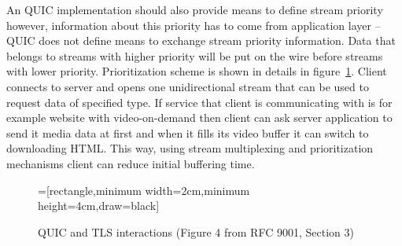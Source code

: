 An QUIC implementation should also provide means to define stream priority however, information about this priority has to come
from application layer -- QUIC does not define means to exchange stream priority information.
Data that belongs to streams with higher priority will be put on the wire before streams with lower priority.
Prioritization scheme is shown in details in figure~\ref{fig:stream-prioritization}.
Client connects to server and opens one unidirectional stream that can be used to request data of specified type.
If service that client is communicating with is for example website with video-on-demand then client can ask server
application to send it media data at first and when it fills its video buffer it can switch to downloading HTML\@.
This way, using stream multiplexing and prioritization mechanisms client can reduce initial buffering time.

\begin{figure}[h]
    \centering
    =[rectangle,minimum width=2cm,minimum height=4cm,draw=black]
    \caption{QUIC and TLS interactions (Figure 4 from RFC 9001, Section 3)}
    \label{fig:stream-prioritization}
\end{figure}

